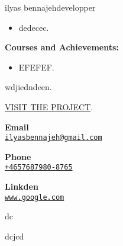 \documentclass{article}
\begin{document}
\begin{cv}[avatar]{ilyas bennajeh}{developper} 

\begin{cvevent}[2323][232323]
    \begin{itemize}
        \item dedecec.
    \end{itemize}
\end{cvevent}\begin{cvevent}[231212][121312]
     \textbf{Courses and Achievements:}    \begin{itemize}
        \item EFEFEF.
    \end{itemize}
\end{cvevent}\cvseparator[2]
\begin{cvevent}[2023]
    wdjiedndeen.

\href{www.google.com}{VISIT THE PROJECT}.\end{cvevent}\cvsidebar %



\begin{cvitem}[Envelope][4]
    \textbf{Email}\\
    \href{mailto:ilyasbennajeh@gmail.com}{\texttt{ilyasbennajeh@gmail.com}}
\end{cvitem}

\cvseparator[3]
\begin{cvitem}[Phone][4]
    \textbf{Phone}\\
    \href{tel:+4657687980-8765}{\texttt{+4657687980-8765}}
\end{cvitem}
\cvseparator[3]
\begin{cvitem}[Globe][4]
    \textbf{Linkden}\\
    \href{www.google.com}{\texttt{www.google.com}}
\end{cvitem} \begin{cvitem}
    dc
\end{cvitem}
 \begin{cvitem}
    dcjcd
\end{cvitem}
 


\end{cv}

\end{document}
